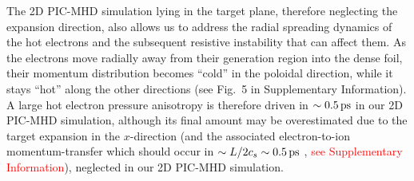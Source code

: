 \documentclass[aps,twocolumn,showpacs,superscriptaddress]{revtex4}
\begin{document}
The  2D PIC-MHD simulation lying in the target plane, therefore neglecting the expansion direction, also allows us to address the radial spreading dynamics of the hot electrons and the subsequent resistive instability that can affect them. As the electrons move radially away from their generation region into the dense foil, their momentum distribution becomes ``cold'' in the poloidal direction, while it stays ``hot'' along the other directions (see Fig.~5 in Supplementary Information). A large hot electron pressure anisotropy is therefore driven in $\sim 0.5\,\rm ps$ in our 2D PIC-MHD simulation, although its final amount may be overestimated due to the target expansion in the $x$-direction (and the associated electron-to-ion momentum-transfer which should occur in $\sim L/2c_s \sim 0.5\,\rm ps$ \cite{PRE_Mora_2005}, \textcolor{red}{see Supplementary Information}), neglected in our 2D PIC-MHD simulation. 
\end{document}
